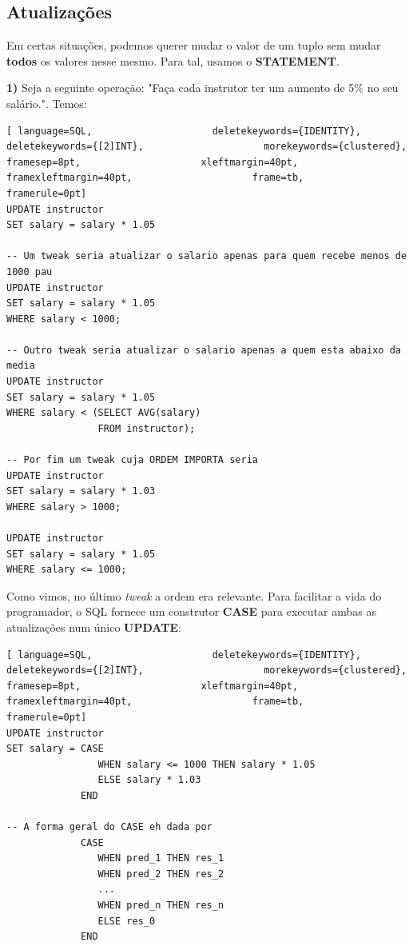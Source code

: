 \documentclass[titlepage]{book}
\theoremstyle{definition}
\begin{document}
\subsection{Atualizações}
Em certas situações, podemos querer mudar o valor de um tuplo sem mudar \textbf{todos} os valores nesse mesmo. Para tal, usamos o \textbf{STATEMENT}.

\textbf{1)} Seja a seguinte operação: "Faça cada instrutor ter um aumento de 5\% no seu salário.". Temos:
\begin{lstlisting}[ language=SQL,                     deletekeywords={IDENTITY},                     deletekeywords={[2]INT},                     morekeywords={clustered},                     framesep=8pt,                     xleftmargin=40pt,                     framexleftmargin=40pt,                     frame=tb,                     framerule=0pt]
UPDATE instructor
SET salary = salary * 1.05

-- Um tweak seria atualizar o salario apenas para quem recebe menos de 1000 pau
UPDATE instructor
SET salary = salary * 1.05
WHERE salary < 1000;

-- Outro tweak seria atualizar o salario apenas a quem esta abaixo da media
UPDATE instructor
SET salary = salary * 1.05
WHERE salary < (SELECT AVG(salary)
                FROM instructor);

-- Por fim um tweak cuja ORDEM IMPORTA seria
UPDATE instructor
SET salary = salary * 1.03
WHERE salary > 1000;

UPDATE instructor
SET salary = salary * 1.05
WHERE salary <= 1000;
\end{lstlisting}

Como vimos, no último \textit{tweak} a ordem era relevante. Para facilitar a vida do programador, o SQL fornece um construtor \textbf{CASE} para executar ambas as atualizações num único \textbf{UPDATE}:
\begin{lstlisting}[ language=SQL,                     deletekeywords={IDENTITY},                     deletekeywords={[2]INT},                     morekeywords={clustered},                     framesep=8pt,                     xleftmargin=40pt,                     framexleftmargin=40pt,                     frame=tb,                     framerule=0pt]
UPDATE instructor
SET salary = CASE
                WHEN salary <= 1000 THEN salary * 1.05
                ELSE salary * 1.03
             END

-- A forma geral do CASE eh dada por
             CASE
                WHEN pred_1 THEN res_1
                WHEN pred_2 THEN res_2
                ...
                WHEN pred_n THEN res_n
                ELSE res_0
             END
\end{lstlisting}
\end{document}
